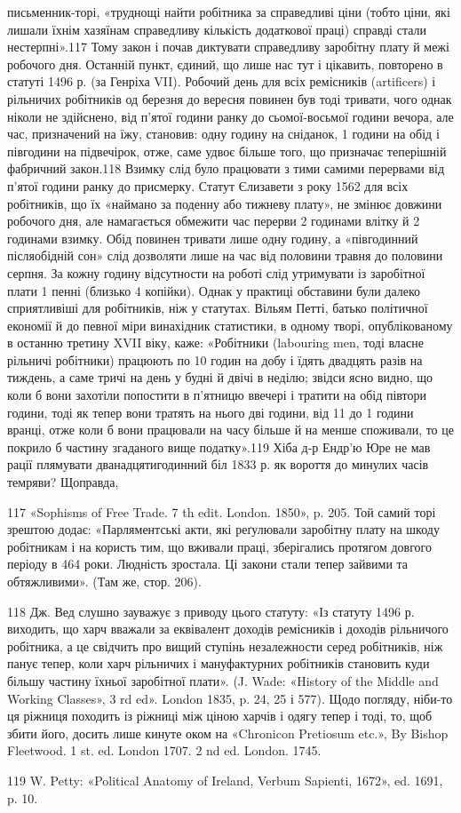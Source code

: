 письменник-торі, «труднощі найти робітника за справедливі
ціни (тобто ціни, які лишали їхнім хазяїнам справедливу кількість
додаткової праці) справді стали нестерпні».117 Тому закон і
почав диктувати справедливу заробітну плату й межі робочого
дня. Останній пункт, єдиний, що лише нас тут і цікавить, повторено
в статуті 1496 р. (за Генріха VII). Робочий день для всіх
ремісників (artificers) і рільничих робітників од березня до вересня
повинен був тоді тривати, чого однак ніколи не здійснено,
від п’ятої години ранку до сьомої-восьмої години вечора,
але час, призначений на їжу, становив: одну годину на сніданок,
1 години на обід і півгодини на підвечірок, отже, саме
удвоє більше того, що призначає теперішній фабричний закон.118
Взимку слід було працювати з тими самими перервами від п’ятої
години ранку до присмерку. Статут Єлизавети з року 1562 для
всіх робітників, що їх «наймано за поденну або тижневу плату»,
не змінює довжини робочого дня, але намагається обмежити час
перерви 2 годинами влітку й 2 годинами взимку. Обід повинен
тривати лише одну годину, а «півгодинний післяобідній сон» слід
дозволяти лише на час від половини травня до половини серпня.
За кожну годину відсутности на роботі слід утримувати із заробітної
плати 1 пенні (близько 4 копійки). Однак у практиці обставини
були далеко сприятливіші для робітників, ніж у статутах.
Вільям Петті, батько політичної економії й до певної міри винахідник
статистики, в одному творі, опублікованому в останню
третину XVII віку, каже: «Робітники (labouring men, тоді власне
рільничі робітники) працюють по 10 годин на добу і їдять двадцять
разів на тиждень, а саме тричі на день у будні й двічі в неділю;
звідси ясно видно, що коли б вони захотіли попостити в
п’ятницю ввечері і тратити на обід півтори години, тоді як тепер
вони тратять на нього дві години, від 11 до 1 години вранці, отже
коли б вони працювали на  часу більше й на  менше споживали,
то це покрило б  частину згаданого вище податку».119
Хіба д-р Ендр’ю Юре не мав рації плямувати дванадцятигодинний
біл 1833 р. як вороття до минулих часів темряви? Щоправда,

117 «Sophisms of Free Trade. 7 th edit. London. 1850», p. 205. Той
самий торі зрештою додає: «Парляментські акти, які реґулювали заробітну
плату на шкоду робітникам і на користь тим, що вживали праці,
зберігались протягом довгого періоду в 464 роки. Людність зростала.
Ці закони стали тепер зайвими та обтяжливими». (Там же, стор. 206).

118    Дж. Вед слушно зауважує з приводу цього статуту: «Із статуту
1496 р. виходить, що харч вважали за еквівалент  доходів ремісників
і  доходів рільничого робітника, а це свідчить про вищий ступінь незалежности
серед робітників, ніж панує тепер, коли харч рільничих і мануфактурних
робітників становить куди більшу частину їхньої заробітної
плати». (J. Wade: «History of the Middle and Working Classes», 3 rd
ed». London 1835, p. 24, 25 і 577). Щодо погляду, ніби-то ця ріжниця
походить із ріжниці між ціною харчів і одягу тепер і тоді, то, щоб збити
його, досить лише кинуте оком на «Chronicon Pretiosum etc.», By Bishop
Fleetwood. 1 st. ed. London 1707. 2 nd ed. London. 1745.

119 W. Petty: «Political Anatomy of Ireland, Verbum Sapienti, 1672»,
ed. 1691, p. 10.
